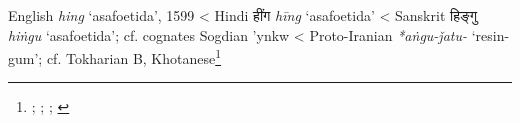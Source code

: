\begin{etymology}\label{ety:hing}
English \textit{hing} `asafoetida', 1599
< Hindi {हींग} \textit{hīng} `asafoetida'
< Sanskrit {हिङ्गु} \textit{hiṅgu} `asafoetida'; cf. cognates Sogdian 'ynkw
< Proto-Iranian \textit{*aṅgu-ǰatu-} `resin-gum'; cf. Tokharian B, Khotanese\footnote{\textcite[s.v. hing]{oed}; \textcite[s.v. hing]{oed}; \textcite[87]{gharib_sogdian_1995}; \textcite[7]{adams_dictionary_2013}}
\end{etymology}
